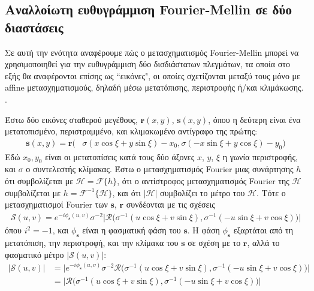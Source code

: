 \subsection{Αναλλοίωτη ευθυγράμμιση Fourier-Mellin σε δύο διαστάσεις}
\label{subsec:01_01_02_7}

Σε αυτή την ενότητα αναφέρουμε πώς ο μετασχηματισμός Fourier-Mellin μπορεί να
χρησιμοποιηθεί για την ευθυγράμμιση δύο δισδιάστατων πλεγμάτων, τα οποία στο
εξής θα αναφέρονται επίσης ως ``εικόνες", οι οποίες σχετίζονται μεταξύ τους
μόνο με affine μετασχηματισμούς, δηλαδή μέσω μετατόπισης, περιστροφής ή/και
κλιμάκωσης.  \cite{Casasent1976,Qin-ShengChen1994a,Reddy1996}.

Έστω δύο εικόνες σταθερού μεγέθους, $\bm{r}(x,y)$, $\bm{s}(x,y)$, όπου η
δεύτερη είναι ένα μετατοπισμένο, περιστραμμένο, και κλιμακωμένο αντίγραφο της
πρώτης:
\begin{align}
  \bm{s}(x,y) = \bm{r}\big( &\sigma(x \cos\xi + y \sin\xi) - x_0, \sigma(-x \sin\xi + y \cos\xi) -y_0 \big) \nonumber
\end{align}
Εδώ $x_0,y_0$ είναι οι μετατοπίσεις κατά τους δύο άξονες $x$, $y$, $\xi$ η
γωνία περιστροφής, και $\sigma$ ο συντελεστής κλίμακας. Έστω ο μετασχηματισμός
Fourier μιας συνάρτησης $h$ ότι συμβολίζεται με $\mathcal{H} =
\mathcal{F}\{h\}$, ότι ο αντίστροφος μετασχηματισμός Fourier της $\mathcal{H}$
συμβολίζεται με $h = \mathcal{F}^{-1}\{\mathcal{H}\}$, και ότι $|\mathcal{H}|$
συμβολίζει το μέτρο του $\mathcal{H}$. Τότε ο μετασχηματισμοί Fourier των
$\bm{s}$, $\bm{r}$
συνδέονται με τις σχέσεις
\begin{align}
  \mathcal{S}(u,v) = e^{-i \phi_{\bm{s}}(u,v)} \sigma^{-2} \big| \mathcal{R} \big( \sigma^{-1}(u \cos\xi + v \sin\xi), \sigma^{-1}(-u \sin\xi + v \cos\xi) \big) \big| \nonumber
\end{align}
όπου $i^2 = -1$, και $\phi_{\bm{s}}$ είναι η φασματική φάση του $\bm{s}$.
Η φάση $\phi_{\bm{s}}$ εξαρτάται από τη μετατόπιση, την περιστροφή, και την
κλίμακα του $\bm{s}$ σε σχέση με το $\bm{r}$, αλλά το φασματικό μέτρο
$|\mathcal{S}(u,v)|$:
\begin{align}
  \big| \mathcal{S}(u,v) \big| &= \big| e^{-i \phi_{\bm{s}}(u,v)} \sigma^{-2} \mathcal{R} \big( \sigma^{-1}(u \cos\xi + v \sin\xi),
                                                                        \sigma^{-1}(-u \sin\xi + v \cos\xi) \big) \big| \nonumber \\
  &= \big| \mathcal{R} \big( \sigma^{-1}(u \cos\xi + v \sin\xi), \sigma^{-1}(-u \sin\xi + v \cos\xi) \big) \big| \label{eq:spectral_magnitude1}
\end{align}
